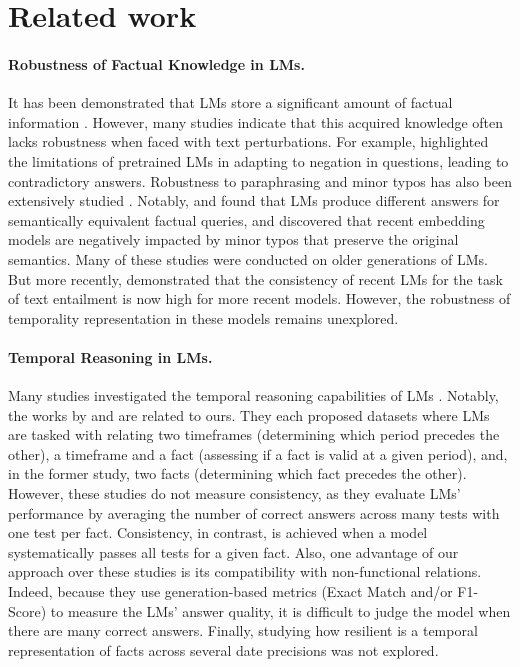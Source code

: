 \section{Related work}
\label{sec:related_work}

\paragraph{Robustness of Factual Knowledge in LMs.} It has been demonstrated that LMs store a significant amount of factual information \cite{petroni, know_what_language_models_know, head_to_tail}. However, many studies indicate that this acquired knowledge often lacks robustness when faced with text perturbations. For example, \citet{robust_negation} highlighted the limitations of pretrained LMs in adapting to negation in questions, leading to contradictory answers. Robustness to paraphrasing and minor typos has also been extensively studied \cite{cc_paraphrase1, cc_paraphrase2, cc_paraphrase3, cc_paraphrase4, cc_paraphrase5}. Notably, \citet{pararel} and \citet{paraphrase1} found that LMs produce different answers for semantically equivalent factual queries, and \citet{robust_typo} discovered that recent embedding models are negatively impacted by minor typos that preserve the original semantics. Many of these studies were conducted on older generations of LMs. But more recently, \citet{verma-etal-2023-evaluating} demonstrated that the consistency of recent LMs for the task of text entailment is now high for more recent models. However, the robustness of temporality representation in these models remains unexplored.

\paragraph{Temporal Reasoning in LMs.} Many studies investigated the temporal reasoning capabilities of LMs \cite{zhang-choi-2021-situatedqa, chu-etal-2024-timebench,tempreason1_mentaqa,fatemi2024testtimebenchmarkevaluating, templama, xiong-etal-2024-large, su-etal-2024-living}. Notably, the works by \citet{tempreason_timequestions} and \citet{tempreason1_bench_temp_reason} are related to ours. They each proposed datasets where LMs are tasked with relating two timeframes (\eg determining which period precedes the other), a timeframe and a fact (\eg assessing if a fact is valid at a given period), and, in the former study, two facts (\eg determining which fact precedes the other). However, these studies do not measure consistency, as they evaluate LMs' performance by averaging the number of correct answers across many tests with one test per fact. Consistency, in contrast, is achieved when a model systematically passes all tests for a given fact. Also, one advantage of our approach over these studies is its compatibility with non-functional relations. Indeed, because they use generation-based metrics (Exact Match and/or F1-Score) to measure the LMs' answer quality, it is difficult to judge the model when there are many correct answers. Finally, studying how resilient is a temporal representation of facts across several date precisions was not explored.

